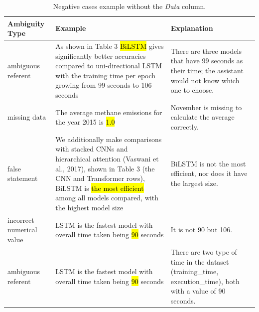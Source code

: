 \begin{table}[t]
    \centering
    \small
    \begin{tabular}{l p{6cm} p{4cm}}
        \hline
        \textbf{Ambiguity Type} & \textbf{Example} & \textbf{Explanation} \\
        \hline

        ambiguous referent &
        As shown in Table 3 \hl{BiLSTM} gives significantly better accuracies compared to uni-directional LSTM with the training time per epoch growing from 99 seconds to 106 seconds &
        There are three models that have 99 seconds as their time; the assistant would not know which one to choose. \\

        missing data &
        The average methane emissions for the year 2015 is \hl{1.0} &
        November is missing to calculate the average correctly. \\

        false statement &
        We additionally make comparisons with stacked CNNs and hierarchical attention (Vaswani et al., 2017), shown in Table 3 (the CNN and Transformer rows), BiLSTM is \hl{the most efficient} among all models compared, with the highest model size &
        BiLSTM is not the most efficient, nor does it have the largest size. \\

        incorrect numerical value &
        LSTM is the fastest model with overall time taken being \hl{90} seconds &
        It is not 90 but 106. \\

        ambiguous referent &
        LSTM is the fastest model with overall time taken being \hl{90} seconds &
        There are two type of time in the dataset (training\_time, execution\_time), both with a value of 90 seconds. \\

        \hline
    \end{tabular}
    \caption{Negative cases example without the \emph{Data} column.}
    \label{tab:ambiguita}
\end{table}





